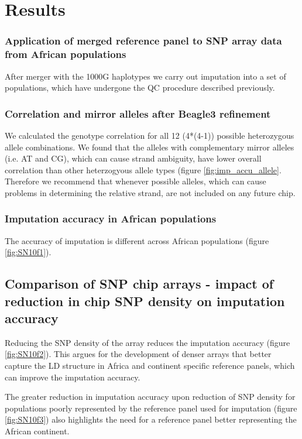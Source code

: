 \section{Results}
\label{sec:rp_results}

\subsubsection{Application of merged reference panel to SNP array data from African populations}
After merger with the \gls{1000G} haplotypes we carry out imputation into a set of populations, which have undergone the QC procedure described previously.

\subsubsection{Correlation and mirror alleles after Beagle3 refinement}
We calculated the genotype correlation for all 12 (4*(4-1)) possible heterozygous allele combinations. We found that the alleles with complementary mirror alleles (i.e. AT and CG), which can cause strand ambiguity, have lower overall correlation than other heterzogyous allele types (figure \ref{fig:imp_accu_allele}. Therefore we recommend that whenever possible alleles, which can cause problems in determining the relative strand, are not included on any future chip.

\subsubsection{Imputation accuracy in African populations}
The accuracy of imputation is different across African populations (figure \ref{fig:SN10f1}).


\subsection{Comparison of SNP chip arrays - impact of reduction in chip SNP density on imputation accuracy}
Reducing the SNP density of the array reduces the imputation accuracy (figure \ref{fig:SN10f2}). This argues for the development of denser arrays that better capture the LD structure in Africa and continent specific reference panels, which can improve the imputation accuracy.


The greater reduction in imputation accuracy upon reduction of SNP density for populations poorly represented by the reference panel used for imputation (figure \ref{fig:SN10f3}) also highlights the need for a reference panel better representing the African continent.


